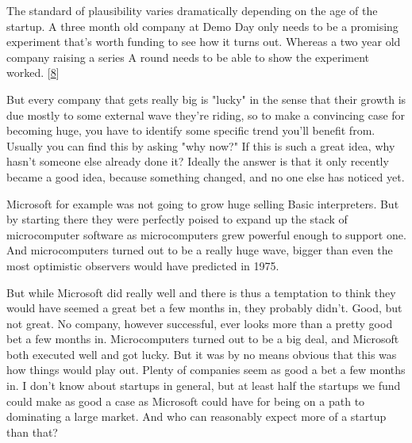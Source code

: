 The
                  standard of plausibility varies dramatically depending on the
                  age of the startup. A three month old company at Demo Day only
                  needs to be a promising experiment that's worth funding to see
                  how it turns out. Whereas a two year old company raising a
                  series A round needs to be able to show the experiment worked.
                  [\href{\#f8n}{8}]

But every company that gets really big is "lucky"
                  in the sense that their growth is due mostly to some external
                  wave they're riding, so to make a convincing case for becoming
                  huge, you have to identify some specific trend you'll benefit
                  from. Usually you can find this by asking "why now?" If this
                  is such a great idea, why hasn't someone else already done it?
                  Ideally the answer is that it only recently became a good
                  idea, because something changed, and no one else has noticed
                  yet.

Microsoft for example was not going to grow
                  huge selling Basic interpreters. But by starting there they
                  were perfectly poised to expand up the stack of microcomputer
                  software as microcomputers grew powerful enough to support
                  one. And microcomputers turned out to be a really huge wave,
                  bigger than even the most optimistic observers would have
                  predicted in 1975.

But while Microsoft did really
                  well and there is thus a temptation to think they would have
                  seemed a great bet a few months in, they probably didn't.
                  Good, but not great. No company, however successful, ever
                  looks more than a pretty good bet a few months in.
                  Microcomputers turned out to be a big deal, and Microsoft both
                  executed well and got lucky. But it was by no means obvious
                  that this was how things would play out. Plenty of companies
                  seem as good a bet a few months in. I don't know about
                  startups in general, but at least half the startups we fund
                  could make as good a case as Microsoft could have for being on
                  a path to dominating a large market. And who can reasonably
                  expect more of a startup than that?


